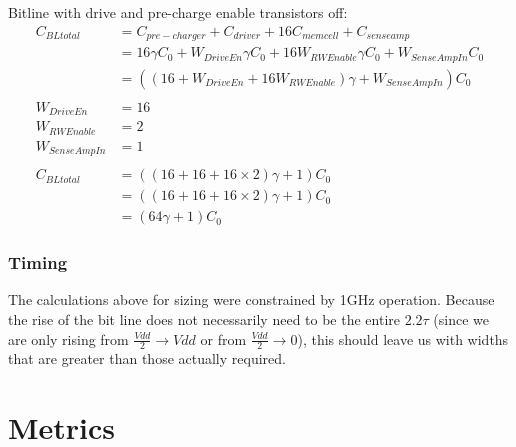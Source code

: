 \documentclass[a4paper]{article}
\begin{document}
Bitline with drive and pre-charge enable transistors off:
\begin{align*}
C_{BLtotal} &= C_{pre-charger} + C_{driver} + 16 C_{memcell} + C_{senseamp}\\
&= 16 \gamma C_0 + W_{DriveEn}\gamma C_0 + 16 W_{RWEnable}\gamma C_0 + W_{SenseAmpIn} C_0\\
&= ((16 + W_{DriveEn}  + 16 W_{RWEnable})\gamma + W_{SenseAmpIn})C_0\\\\
W_{DriveEn} &= 16\\
W_{RWEnable} &= 2\\
W_{SenseAmpIn} &= 1\\\\
C_{BLtotal} &= ((16 + 16  + 16 \times 2)\gamma + 1)C_0\\
&= ((16 + 16  + 16 \times 2)\gamma + 1)C_0\\
&= (64\gamma + 1) C_0
\end{align*}

\subsubsection{Timing}
\label{subsec:time_calc}
The calculations above for sizing were constrained by 1GHz operation. Because the rise of the bit line does not necessarily need to be the entire $2.2\tau$ (since we are only rising from $\frac{Vdd}{2} \rightarrow Vdd$ or from $\frac{Vdd}{2} \rightarrow 0$), this should leave us with widths that are greater than those actually required.



\section{Metrics}
\label{sec:metrics}
\end{document}
